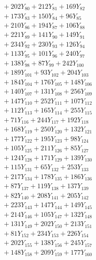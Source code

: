 \documentclass[a4paper,10pt]{article}
\begin{document}
{\begin{align}
&\;  + 202 Y_{80} + 212 Y_{81} + 169 Y_{82} \\[0.3ex]
&\;  + 173 Y_{83} + 150 Y_{84} + 96 Y_{85} \\[0.3ex]
&\;  + 210 Y_{86} + 194 Y_{87} + 106 Y_{88} \\[0.5ex]\allowbreak
&\;  + 221 Y_{89} + 141 Y_{90} + 149 Y_{91} \\[0.3ex]
&\;  + 234 Y_{92} + 230 Y_{93} + 126 Y_{94} \\[0.3ex]
&\;  + 113 Y_{95} + 101 Y_{96} + 240 Y_{97} \\[0.3ex]
&\;  + 138 Y_{98} + 87 Y_{99} + 242 Y_{100} \\[0.3ex]
&\;  + 189 Y_{101} + 93 Y_{102} + 204 Y_{103} \\[0.3ex]
&\;  + 184 Y_{104} + 176 Y_{105} + 148 Y_{106} \\[0.3ex]
&\;  + 140 Y_{107} + 131 Y_{108} + 256 Y_{109} \\[0.3ex]
&\;  + 147 Y_{110} + 252 Y_{111} + 107 Y_{112} \\[0.3ex]
&\;  + 112 Y_{113} + 165 Y_{114} + 255 Y_{115} \\[0.3ex]
&\;  + 71 Y_{116} + 244 Y_{117} + 192 Y_{118} \\[0.5ex]\allowbreak
&\;  + 168 Y_{119} + 250 Y_{120} + 132 Y_{121} \\[0.3ex]
&\;  + 177 Y_{122} + 195 Y_{123} + 98 Y_{124} \\[0.3ex]
&\;  + 105 Y_{125} + 211 Y_{126} + 85 Y_{127} \\[0.3ex]
&\;  + 124 Y_{128} + 171 Y_{129} + 139 Y_{130} \\[0.3ex]
&\;  + 115 Y_{131} + 65 Y_{132} + 253 Y_{133} \\[0.3ex]
&\;  + 217 Y_{134} + 178 Y_{135} + 186 Y_{136} \\[0.3ex]
&\;  + 87 Y_{137} + 119 Y_{138} + 137 Y_{139} \\[0.3ex]
&\;  + 82 Y_{140} + 208 Y_{141} + 205 Y_{142} \\[0.3ex]
&\;  + 223 Y_{143} + 147 Y_{144} + 149 Y_{145} \\[0.3ex]
&\;  + 214 Y_{146} + 105 Y_{147} + 132 Y_{148} \\[0.5ex]\allowbreak
&\;  + 131 Y_{149} + 202 Y_{150} + 213 Y_{151} \\[0.3ex]
&\;  + 81 Y_{152} + 234 Y_{153} + 226 Y_{154} \\[0.3ex]
&\;  + 202 Y_{155} + 138 Y_{156} + 245 Y_{157} \\[0.3ex]
&\;  + 148 Y_{158} + 209 Y_{159} + 177 Y_{160} \\[0.3ex]

\end{align}}
\end{document}
